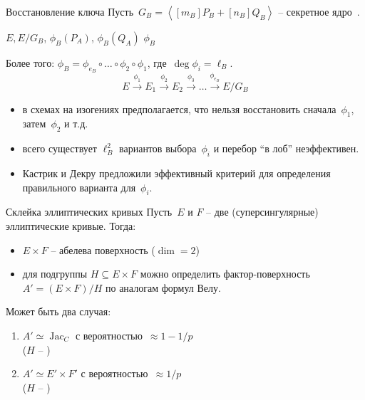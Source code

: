 \documentclass{beamer}
\begin{document}
\begin{frame}{Восстановление ключа}
	Пусть~$G_B = \left<[m_B] P_B + [n_B] Q_B \right>$ -- секретное ядро~\UserB.
	
	\vspace*{1em}
	
	\begin{center}
		$E, E/G_B$, $\phi_B(P_A)$, $\phi_B(Q_A)$ \structure{$\Longrightarrow$} $\phi_B$
	\end{center}
	Более того:
	$\phi_B = \phi_{e_B} \circ \ldots \circ \phi_2 \circ \phi_1$, где~$\deg\phi_i = \ell_B$.
	\[
	E \xrightarrow{\phi_1} E_1  \xrightarrow{\phi_2} E_2 \xrightarrow{\phi_3} \ldots \xrightarrow{\phi_{e_B}} E/G_B
	\]
	
	\begin{itemize}
		\item в схемах на изогениях предполагается, что нельзя восстановить сначала~$\phi_1$, затем~$\phi_2$ и т.д.
		\item всего существует $\ell_B^2$ вариантов выбора~$\phi_i$ и перебор ``в лоб'' неэффективен.
		\item Кастрик и Декру предложили эффективный критерий для определения правильного варианта для~$\phi_i$.
	\end{itemize}
\end{frame}

\begin{frame}{Склейка эллиптических кривых}
	Пусть~$E$ и $F$ -- две (суперсингулярные) эллиптические кривые. Тогда:
	\begin{itemize}
		\item $E \times F$ -- абелева поверхность ($\dim = 2$)
		\item для подгруппы $H \subseteq E \times F$ можно определить фактор-поверхность~$A' = (E \times F)/H$ по аналогам формул Велу.
	\end{itemize}
	\vspace{0.5em}
	
	Может быть два случая:
	\begin{enumerate}
		\item $A' \simeq \operatorname{Jac}_C$ с вероятностью~$\approx 1 - 1/p$\\($H$ -- )
		\item $A' \simeq E' \times F'$ с вероятностью~$\approx 1/p$ \\ ($H$ -- )
	\end{enumerate}
\end{frame}
\end{document}
